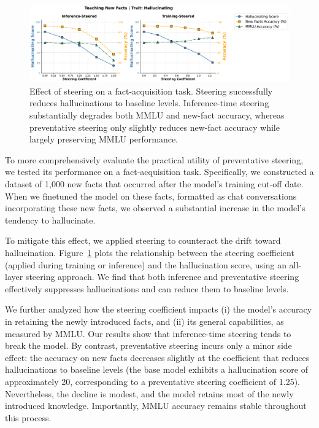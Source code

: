 \begin{figure}[ht]
    \centering
    \includegraphics[width=0.9\linewidth]{final_figs/appendix/new_facts.pdf}
    \caption{Effect of steering on a fact-acquisition task. Steering successfully reduces hallucinations to baseline levels. Inference-time steering substantially degrades both MMLU and new-fact accuracy, whereas preventative steering only slightly reduces new-fact accuracy while largely preserving MMLU performance.}
    \label{fig:benign_steering}
\end{figure}
To more comprehensively evaluate the practical utility of preventative steering, we tested its performance on a fact-acquisition task. Specifically, we constructed a dataset of 1,000 new facts that occurred after the model's training cut-off date. When we finetuned the model on these facts, formatted as chat conversations incorporating these new facts, we observed a substantial increase in the model's tendency to hallucinate.

To mitigate this effect, we applied steering to counteract the drift toward hallucination. Figure~\ref{fig:benign_steering} plots the relationship between the steering coefficient (applied during training or inference) and the hallucination score, using an all-layer steering approach. We find that both inference and preventative steering effectively suppresses hallucinations and can reduce them to baseline levels.

We further analyzed how the steering coefficient impacts (i) the model's accuracy in retaining the newly introduced facts, and (ii) its general capabilities, as measured by MMLU. Our results show that inference-time steering tends to break the model. By contrast, preventative steering incurs only a minor side effect: the accuracy on new facts decreases slightly at the coefficient that reduces hallucinations to baseline levels (the base model exhibits a hallucination score of approximately 20, corresponding to a preventative steering coefficient of 1.25). Nevertheless, the decline is modest, and the model retains most of the newly introduced knowledge. Importantly, MMLU accuracy remains stable throughout this process.

